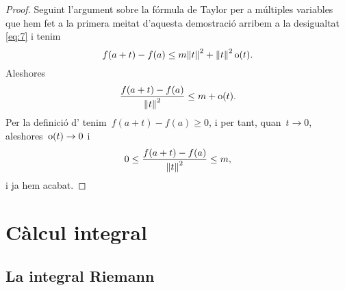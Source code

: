 \documentclass[../../main.tex]{subfiles}
\begin{document}
\begin{proof}
        Seguint l'argument sobre la fórmula de Taylor per a múltiples variables que hem fet a la primera meitat d'aquesta demostració arribem a la desigualtat \eqref{eq:7} i tenim
        \[
            f(a+t)-f(a)\leq m\norm{t}^{2}+\norm{t}^{2}\omicron(t).
        \]
        Aleshores
        \[
            \frac{f(a+t)-f(a)}{\norm{t}^{2}}\leq m+\omicron(t).
        \]
        Per la definició d' tenim~\(f(a+t)-f(a)\geq0\), i per tant, quan~\(t\to0\), aleshores~\(\operatorname{o}(t)\to0\) i
        \[
            0\leq\frac{f(a+t)-f(a)}{\norm{t}^{2}}\leq m,
        \]
        i ja hem acabat.
    \end{proof}
\chapter{Càlcul integral}
\section{La integral Riemann}
\end{document}
